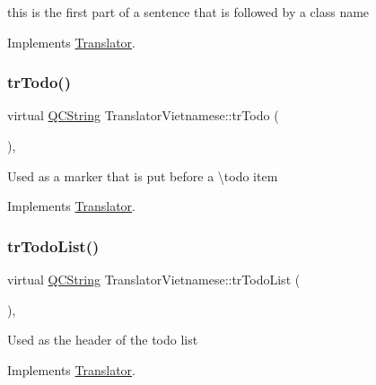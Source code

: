 this is the first part of a sentence that is followed by a class name 

Implements \mbox{\hyperlink{class_translator}{Translator}}.

\mbox{\label{class_translator_vietnamese_a3df6262687d82cdc1f1b01c48a7df82c}} 
\subsubsection{\texorpdfstring{trTodo()}{trTodo()}}
{\footnotesize\ttfamily virtual \mbox{\hyperlink{class_q_c_string}{Q\+C\+String}} Translator\+Vietnamese\+::tr\+Todo (\begin{DoxyParamCaption}{ }\end{DoxyParamCaption})\hspace{0.3cm}{\ttfamily [inline]}, {\ttfamily [virtual]}}

Used as a marker that is put before a \textbackslash{}todo item 

Implements \mbox{\hyperlink{class_translator}{Translator}}.

\mbox{\label{class_translator_vietnamese_a1b38dbdc9390ca10d8b54b9f29b4e57e}} 
\subsubsection{\texorpdfstring{trTodoList()}{trTodoList()}}
{\footnotesize\ttfamily virtual \mbox{\hyperlink{class_q_c_string}{Q\+C\+String}} Translator\+Vietnamese\+::tr\+Todo\+List (\begin{DoxyParamCaption}{ }\end{DoxyParamCaption})\hspace{0.3cm}{\ttfamily [inline]}, {\ttfamily [virtual]}}

Used as the header of the todo list 

Implements \mbox{\hyperlink{class_translator}{Translator}}.

\mbox{\label{class_translator_vietnamese_a50c0eababc13e83e0ddf8caff673b40c}} 
